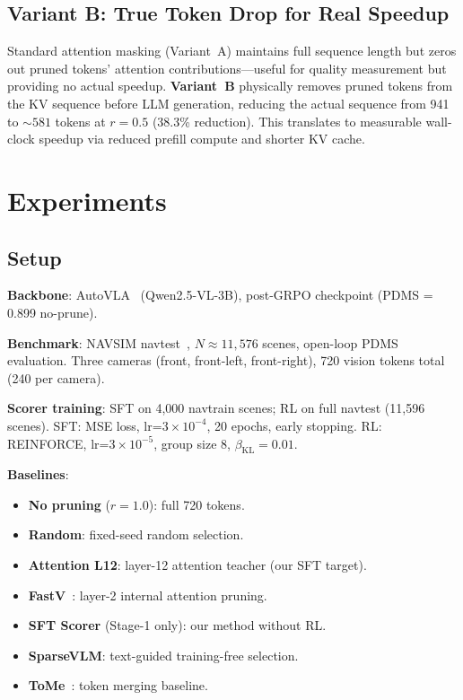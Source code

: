 \documentclass[letterpaper]{article} %
\begin{document}
\subsection{Variant B: True Token Drop for Real Speedup}

Standard attention masking (Variant~A) maintains full sequence length but zeros out pruned tokens' attention contributions---useful for quality measurement but providing no actual speedup.
\textbf{Variant~B} physically removes pruned tokens from the KV sequence before LLM generation, reducing the actual sequence from 941 to ${\sim}581$ tokens at $r{=}0.5$ (38.3\% reduction).
This translates to measurable wall-clock speedup via reduced prefill compute and shorter KV cache.

\section{Experiments}
\label{sec:exp}

\subsection{Setup}

\textbf{Backbone}: AutoVLA~\citep{autovla2025} (Qwen2.5-VL-3B), post-GRPO checkpoint (PDMS = 0.899 no-prune).

\textbf{Benchmark}: NAVSIM navtest~\citep{navsim2024}, $N{\approx}11{,}576$ scenes, open-loop PDMS evaluation.
Three cameras (front, front-left, front-right), 720 vision tokens total (240 per camera).

\textbf{Scorer training}: SFT on 4,000 navtrain scenes; RL on full navtest (11,596 scenes).
SFT: MSE loss, lr=$3{\times}10^{-4}$, 20 epochs, early stopping.
RL: REINFORCE, lr=$3{\times}10^{-5}$, group size 8, $\beta_\text{KL}{=}0.01$.

\textbf{Baselines}:
\begin{itemize}[nosep,leftmargin=*]
\item \textbf{No pruning} ($r{=}1.0$): full 720 tokens.
\item \textbf{Random}: fixed-seed random selection.
\item \textbf{Attention L12}: layer-12 attention teacher (our SFT target).
\item \textbf{FastV}~\citep{fastv2024}: layer-2 internal attention pruning.
\item \textbf{SFT Scorer} (Stage-1 only): our method without RL.
\item \textbf{SparseVLM}: text-guided training-free selection.
\item \textbf{ToMe}~\citep{tome2023}: token merging baseline.
\end{itemize}
\end{document}
